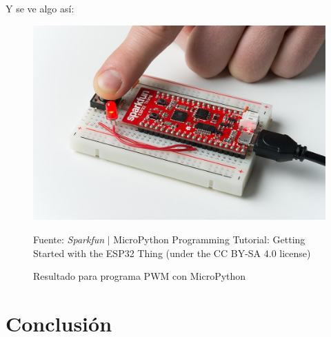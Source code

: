 \documentclass[conference]{IEEEtran}
\begin{document}
Y se ve algo así:

\begin{figure}[H]
\centering
\includegraphics[width=0.3\paperwidth]{images/esp32-micropython-pwm-photo}
\caption{Resultado para programa PWM con MicroPython} \footnotesize
Fuente: \textit{Sparkfun} $\mid$ MicroPython Programming Tutorial: Getting Started with the ESP32 Thing \cite{hymel} (under the CC BY-SA 4.0 license)
\end{figure}

\section{Conclusión}\label{sec:conclusion}




\printbibliography
\end{document}
